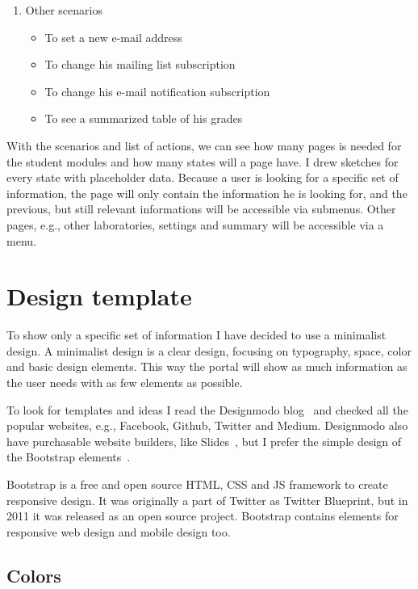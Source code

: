\begin{enumerate}
	\item Other scenarios
	\begin{itemize}
		\item To set a new e-mail address
		\item To change his mailing list subscription
		\item To change his e-mail notification subscription
		\item To see a summarized table of his grades
	\end{itemize}
	
\end{enumerate}

With the scenarios and list of actions, we can see how many pages is needed for the student modules and how many states will a page have. I drew sketches  for every state with placeholder data. Because a user is looking for a specific set of information, the page will only contain the information he is looking for, and the previous, but still relevant informations will be accessible via submenus. Other pages, e.g., other laboratories, settings and summary will be accessible via a menu.

\section{Design template}

To show only a specific set of information I have decided to use a minimalist design. A minimalist design is a clear design, focusing on typography, space, color and basic design elements. This way the portal will show as much information as the user needs with as few elements as possible. 

To look for templates and ideas I read the Designmodo blog~\cite{Designmodo} and checked all the popular websites, e.g., Facebook, Github, Twitter and Medium. Designmodo also have purchasable website builders, like Slides~\cite{Designmodo-slides}, but I prefer the simple design of the Bootstrap elements~\cite{Bootstrap}. 

Bootstrap is a free and open source HTML, CSS and JS framework to create responsive design. It was originally a part of Twitter as Twitter Blueprint, but in 2011 it was released as an open source project. Bootstrap contains elements for responsive web design and mobile design too.


\subsection{Colors}

